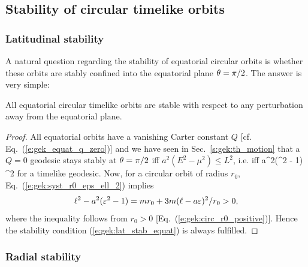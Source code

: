 \subsection{Stability of circular timelike orbits} \label{s:gek:circ_orb_stab}

\subsubsection{Latitudinal stability}

A natural question regarding the stability of equatorial circular orbits
is whether these orbits are stably confined into the equatorial plane
$\theta=\pi/2$. The answer is very simple:
\begin{prop}
All equatorial circular timelike orbits are stable with respect to any perturbation
away from the equatorial plane.
\end{prop}
\begin{proof}
All equatorial orbits have a vanishing Carter constant $Q$
[cf. Eq.~(\ref{e:gek_equat_q_zero})] and we
have seen in Sec.~\ref{s:gek:th_motion} that a $Q=0$ geodesic stays stably at
$\theta=\pi/2$ iff $a^2(E^2 - \mu^2) \leq L^2$, i.e. iff
\be \label{e:gek:lat_stab_equat}
    a^2(\veps^2 - 1) \leq \ell^2
\ee
for a timelike geodesic.
Now, for a circular orbit of radius $r_0$,
Eq.~(\ref{e:gek:syst_r0_eps_ell_2}) implies
\[
   \ell^2 - a^2 (\varepsilon^2 - 1) = m r_0 + 3 m (\ell - a \varepsilon)^2 / r_0 > 0 ,
\]
where the inequality follows from
$r_0 > 0$ [Eq.~(\ref{e:gek:circ_r0_positive})].
Hence the stability condition (\ref{e:gek:lat_stab_equat}) is always fulfilled.
\end{proof}


\subsubsection{Radial stability}

